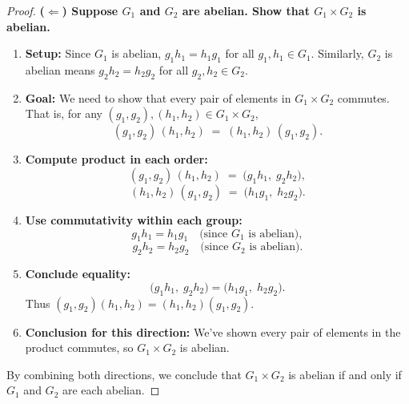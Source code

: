 \documentclass[12pt]{article}
\theoremstyle{definition} %
\theoremstyle{plain} %
\begin{document}
\begin{proof}
\bigskip
\noindent\textbf{(\(\Longleftarrow\)) Suppose $G_1$ and $G_2$ are abelian. Show that $G_1\times G_2$ is abelian.}

\begin{enumerate}
  \item \textbf{Setup:} Since $G_1$ is abelian, $g_1 h_1 = h_1 g_1$ for all $g_1, h_1 \in G_1$. Similarly, $G_2$ is abelian means $g_2 h_2 = h_2 g_2$ for all $g_2, h_2 \in G_2$.

  \item \textbf{Goal:} We need to show that every pair of elements in $G_1\times G_2$ commutes. That is, for any $(g_1, g_2), (h_1, h_2)\in G_1\times G_2$,
  \[
    (g_1,g_2)\,(h_1,h_2) \;=\; (h_1,h_2)\,(g_1,g_2).
  \]

  \item \textbf{Compute product in each order:}
    \[
      (g_1,g_2)\,(h_1,h_2) 
      \;=\; 
      \bigl(g_1 h_1,\; g_2 h_2\bigr),
    \]
    \[
      (h_1,h_2)\,(g_1,g_2) 
      \;=\; 
      \bigl(h_1 g_1,\; h_2 g_2\bigr).
    \]

  \item \textbf{Use commutativity within each group:}
    \[
      g_1 h_1 = h_1 g_1 
      \quad \text{(since $G_1$ is abelian)},
    \]
    \[
      g_2 h_2 = h_2 g_2
      \quad \text{(since $G_2$ is abelian)}.
    \]

  \item \textbf{Conclude equality:}
    \[
      \bigl(g_1 h_1,\; g_2 h_2\bigr)
      =
      \bigl(h_1 g_1,\; h_2 g_2\bigr).
    \]
    Thus $(g_1,g_2)(h_1,h_2) = (h_1,h_2)(g_1,g_2)$.

  \item \textbf{Conclusion for this direction:} We've shown every pair of elements in the product commutes, so $G_1\times G_2$ is abelian.
\end{enumerate}

By combining both directions, we conclude that $G_1 \times G_2$ is abelian if and only if $G_1$ and $G_2$ are each abelian.
\end{proof}
\end{document}
